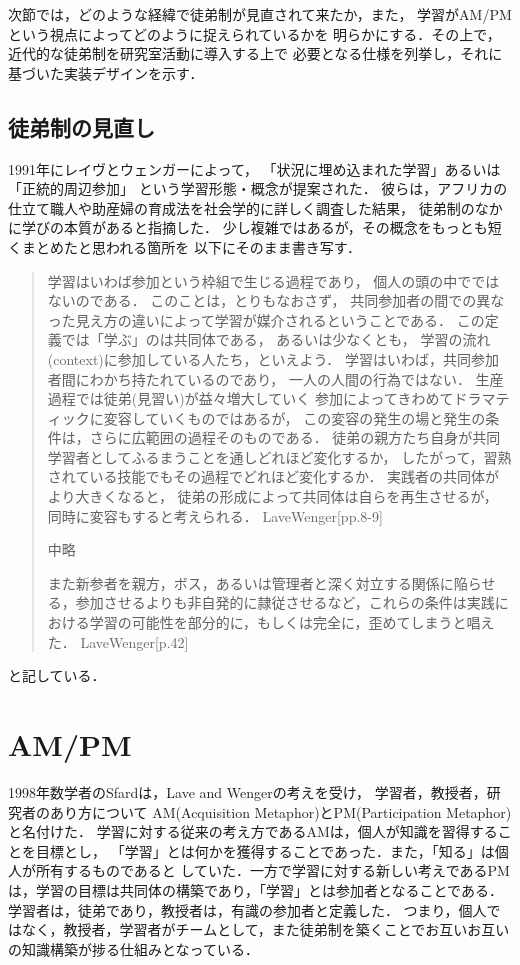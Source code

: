 \documentclass{hissymp}
\begin{document}
次節では，どのような経緯で徒弟制が見直されて来たか，また，
学習がAM/PMという視点によってどのように捉えられているかを
明らかにする．その上で，近代的な徒弟制を研究室活動に導入する上で
必要となる仕様を列挙し，それに基づいた実装デザインを示す．

\subsection{徒弟制の見直し}
\label{sec:org6a6bea4}
1991年にレイヴとウェンガーによって，
  「状況に埋め込まれた学習」あるいは「正統的周辺参加」
  という学習形態・概念が提案された．
  彼らは，アフリカの仕立て職人や助産婦の育成法を社会学的に詳しく調査した結果，
  徒弟制のなかに学びの本質があると指摘した．
少し複雑ではあるが，その概念をもっとも短くまとめたと思われる箇所を
以下にそのまま書き写す．
\begin{quote}
  学習はいわば参加という枠組で生じる過程であり，
  個人の頭の中でではないのである．
  このことは，とりもなおさず，
共同参加者の間での異なった見え方の違いによって学習が媒介されるということである．
この定義では「学ぶ」のは共同体である，
あるいは少なくとも，
学習の流れ(context)に参加している人たち，といえよう．
学習はいわば，共同参加者間にわかち持たれているのであり，
一人の人間の行為ではない．
生産過程では徒弟(見習い)が益々増大していく
参加によってきわめてドラマティックに変容していくものではあるが，
この変容の発生の場と発生の条件は，さらに広範囲の過程そのものである．
徒弟の親方たち自身が共同学習者としてふるまうことを通しどれほど変化するか，
したがって，習熟されている技能でもその過程でどれほど変化するか．
実践者の共同体がより大きくなると，
徒弟の形成によって共同体は自らを再生させるが，
同時に変容もすると考えられる．
LaveWenger[pp.8-9]

中略

また新参者を親方，ボス，あるいは管理者と深く対立する関係に陥らせる，参加させるよりも非自発的に隷従させるなど，これらの条件は実践における学習の可能性を部分的に，もしくは完全に，歪めてしまうと唱えた．
 LaveWenger[p.42]
\end{quote}
と記している．

\section{AM/PM}
\label{sec:orgc0f943d}

1998年数学者のSfardは，Lave and Wengerの考えを受け，
学習者，教授者，研究者のあり方について
AM(Acquisition Metaphor)とPM(Participation Metaphor)と名付けた．
学習に対する従来の考え方であるAMは，個人が知識を習得することを目標とし，
「学習」とは何かを獲得することであった．また，「知る」は個人が所有するものであると
していた．一方で学習に対する新しい考えであるPMは，学習の目標は共同体の構築であり，「学習」とは参加者となることである．学習者は，徒弟であり，教授者は，有識の参加者と定義した．
つまり，個人ではなく，教授者，学習者がチームとして，また徒弟制を築くことでお互いお互いの知識構築が捗る仕組みとなっている．
\end{document}
